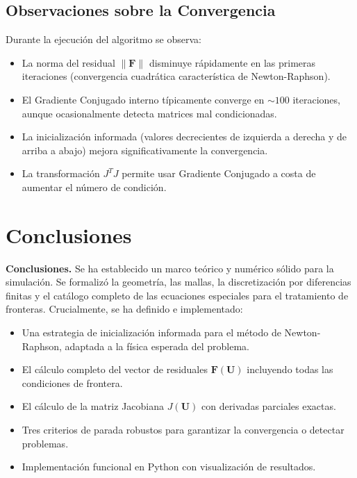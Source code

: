 \documentclass[11pt,letterpaper]{article}
\begin{document}
\subsection{Observaciones sobre la Convergencia}

Durante la ejecución del algoritmo se observa:

\begin{itemize}
    \item La norma del residual $\|\mathbf{F}\|$ disminuye rápidamente en las primeras iteraciones (convergencia cuadrática característica de Newton-Raphson).
    \item El Gradiente Conjugado interno típicamente converge en $\sim 100$ iteraciones, aunque ocasionalmente detecta matrices mal condicionadas.
    \item La inicialización informada (valores decrecientes de izquierda a derecha y de arriba a abajo) mejora significativamente la convergencia.
    \item La transformación $J^T J$ permite usar Gradiente Conjugado a costa de aumentar el número de condición.
\end{itemize}

\newpage
\section{Conclusiones}

\textbf{Conclusiones.} Se ha establecido un marco teórico y numérico sólido para la simulación. Se formalizó la geometría, las mallas, la discretización por diferencias finitas y el catálogo completo de las ecuaciones especiales para el tratamiento de fronteras. Crucialmente, se ha definido e implementado:

\begin{itemize}
    \item Una estrategia de inicialización informada para el método de Newton-Raphson, adaptada a la física esperada del problema.
    \item El cálculo completo del vector de residuales $\mathbf{F}(\mathbf{U})$ incluyendo todas las condiciones de frontera.
    \item El cálculo de la matriz Jacobiana $J(\mathbf{U})$ con derivadas parciales exactas.
    \item Tres criterios de parada robustos para garantizar la convergencia o detectar problemas.
    \item Implementación funcional en Python con visualización de resultados.
\end{itemize}
\end{document}
